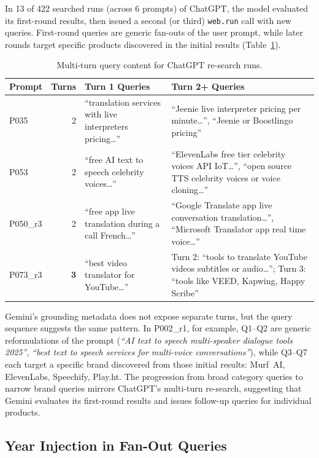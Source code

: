 In 13 of 422 searched runs  (across 6 prompts) of ChatGPT, the model evaluated its first-round results, 
then issued a second (or third) \texttt{web.run} call with new queries. 
First-round queries are generic fan-outs of the user prompt, while later rounds target specific products discovered in the initial results (Table~\ref{tab:multi-turn-queries}).
\begin{table}[H]
\centering
\caption{Multi-turn query content for ChatGPT re-search runs.}
\label{tab:multi-turn-queries}
\small
\begin{tabular}{lrp{3.8cm}p{4.5cm}}
\toprule
Prompt & Turns & Turn 1 Queries & Turn 2+ Queries \\
\midrule
P035 & 2 & ``translation services with live interpreters pricing\ldots'' & ``Jeenie live interpreter pricing per minute\ldots'', ``Jeenie or Boostlingo pricing'' \\
P053 & 2 & ``free AI text to speech celebrity voices\ldots'' & ``ElevenLabs free tier celebrity voices API IoT\ldots'', ``open source TTS celebrity voices or voice cloning\ldots'' \\
P050\_r3 & 2 & ``free app live translation during a call French\ldots'' & ``Google Translate app live conversation translation\ldots'', ``Microsoft Translator app real time voice\ldots'' \\
P073\_r3 & \textbf{3} & ``best video translator for YouTube\ldots'' & Turn 2: ``tools to translate YouTube videos subtitles or audio\ldots''; Turn 3: ``tools like VEED, Kapwing, Happy Scribe'' \\
\bottomrule
\end{tabular}
\end{table}

Gemini's grounding metadata does not expose separate turns, but the query sequence suggests the same pattern. In P002\_r1, for example, Q1--Q2 are generic reformulations of the prompt (\emph{``AI text to speech multi-speaker dialogue tools 2025''}, \emph{``best text to speech services for multi-voice conversations''}), while Q3--Q7 each target a specific brand discovered from those initial results: Murf~AI, ElevenLabs, Speechify, Play.ht. The progression from broad category queries to narrow brand queries mirrors ChatGPT's multi-turn re-search, suggesting that Gemini evaluates its first-round results and issues follow-up queries for individual products. 

\subsection{Year Injection in Fan-Out Queries}
\label{sec:freshness-subsection}

